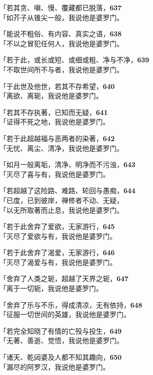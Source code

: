 「若其贪、嗔、慢、覆藏都已脱落，\hfill{\grayfootnotesize \textbf{637}} \\
「如芥子从锥尖一般，我说他是婆罗门。


「能说不粗俗、有内容、真实之语，\hfill{\grayfootnotesize \textbf{638}} \\
「不以之冒犯任何人，我说他是婆罗门。


「若于此，或长或短、或细或粗、净与不净，\hfill{\grayfootnotesize \textbf{639}} \\
「不取世间所不与者，我说他是婆罗门。


「于此世及他世，若其不存希望，\hfill{\grayfootnotesize \textbf{640}} \\
「离欲、离轭，我说他是婆罗门。


「若其不存执著，已知而无疑，\hfill{\grayfootnotesize \textbf{641}} \\
「证得不死之地，我说他是婆罗门。


「若于此超越福与恶两者的染著，\hfill{\grayfootnotesize \textbf{642}} \\
「无忧、离尘、清净，我说他是婆罗门。


「如月一般离垢，清净、明净而不污浊，\hfill{\grayfootnotesize \textbf{643}} \\
「灭尽了喜与有，我说他是婆罗门。


「若超越了这险路、难路、轮回与愚痴，\hfill{\grayfootnotesize \textbf{644}} \\
「已度，已到彼岸，禅修者不动、无疑，\\
「以无所取著而止息，我说他是婆罗门。


「若于此舍弃了爱欲，无家游行，\hfill{\grayfootnotesize \textbf{645}} \\
「灭尽了爱欲与有，我说他是婆罗门。


「若于此舍弃了渴爱，无家游行，\hfill{\grayfootnotesize \textbf{646}} \\
「灭尽了渴爱与有，我说他是婆罗门。


「舍弃了人类之轭，超越了天界之轭，\hfill{\grayfootnotesize \textbf{647}} \\
「离于一切轭，我说他是婆罗门。


「舍弃了乐与不乐，得成清凉，无有依持，\hfill{\grayfootnotesize \textbf{648}} \\
「征服一切世间的英雄，我说他是婆罗门。


「若完全知晓了有情的亡殁与投生，\hfill{\grayfootnotesize \textbf{649}} \\
「无著、善逝、觉悟，我说他是婆罗门。


「诸天、乾闼婆及人都不知其趣向，\hfill{\grayfootnotesize \textbf{650}} \\
「漏尽的阿罗汉，我说他是婆罗门。


